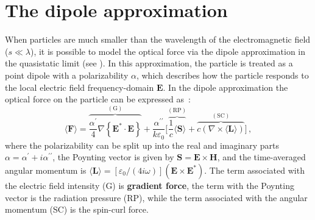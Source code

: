 \section{The dipole approximation~\cite{ownpub1, ownpub3}}\label{sec:dip}

When particles are much smaller than the wavelength of the electromagnetic field ($s\ll \lambda$), it is possible to model the optical force via the dipole approximation in the
quasistatic limit (see ). In this approximation, the particle is treated as a point dipole with a polarizability $\alpha$, which describes how the particle responds to the local electric field frequency-domain $\mathbf{E}$.
In the dipole approximation the optical force on the particle can be expressed as~\cite{novotny}:
\begin{equation}\label{eq:dip_force}
    \langle\mathbf{F}\rangle=\overbrace{\frac{\alpha^{\prime}}{4} \nabla\left\{\mathbf{E}^* \cdot \mathbf{E}\right\}}^{(\text{G})}
    +\frac{\alpha^{\prime \prime}}{k \varepsilon_0} \Big[\overbrace{\frac{1}{c}\langle \mathbf{S} \rangle}^{(\text{RP})} + \overbrace{c \left( \nabla \times \langle \mathbf{L} \rangle \right)}^{(\text{SC})}\Big]\,,
\end{equation}
where the polarizability can be split up into the real and imaginary parts 
$\alpha=\alpha^\prime + i \alpha^{\prime \prime}$, the Poynting vector is given by $\mathbf{S} = \mathbf{E} \times \mathbf{H}$, and the time-averaged angular momentum is 
$\langle \mathbf{L} \rangle = [\varepsilon_0/(4 i \omega)](\mathbf{E} \times \mathbf{E}^*)$. 
The term associated with the electric field intensity (G) is \textbf{gradient force}, the term with the Poynting vector is the radiation pressure (RP), while the term associated 
with the angular momentum (SC) is the spin-curl force.

